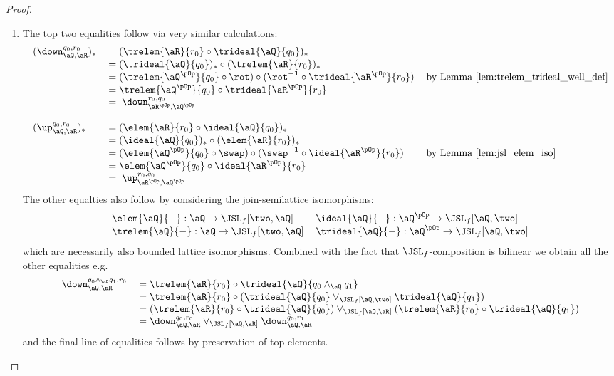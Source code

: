 \documentclass{article}
\begin{document}
\begin{proof}
\item
\begin{enumerate}
\item
The top two equalities follow via very similar calculations:
\[
\begin{tabular}{lll}
$(\down_{\aQ,\aR}^{q_0,r_0})_*$
&
$= (\trelem{\aR}{r_0} \circ \trideal{\aQ}{q_0})_*$
\\&
$= (\trideal{\aQ}{q_0})_* \circ (\trelem{\aR}{r_0})_*$
\\&
$= (\trelem{\aQ^{\pOp}}{q_0} \circ \rot) \circ (\rot^{\bf-1} \circ \trideal{\aR^{\pOp}}{r_0})$
& by Lemma \ref{lem:trelem_trideal_well_def}
\\&
$= \trelem{\aQ^{\pOp}}{q_0} \circ \trideal{\aR^{\pOp}}{r_0}$
\\&
$= \; \down_{\aR^{\pOp},\aQ^{\pOp}}^{r_0,q_0}$
\\
\\
$(\up_{\aQ,\aR}^{q_0,r_0})_*$
&
$= (\elem{\aR}{r_0} \circ \ideal{\aQ}{q_0})_*$
\\&
$= (\ideal{\aQ}{q_0})_* \circ (\elem{\aR}{r_0})_*$
\\&
$= (\elem{\aQ^{\pOp}}{q_0} \circ \swap) \circ (\swap^{\bf-1} \circ \ideal{\aR^{\pOp}}{r_0})$
& by Lemma \ref{lem:jsl_elem_iso}
\\&
$= \elem{\aQ^{\pOp}}{q_0} \circ \ideal{\aR^{\pOp}}{r_0}$
\\&
$= \; \up_{\aR^{\pOp},\aQ^{\pOp}}^{r_0,q_0}$
\end{tabular}
\]
The other equalties also follow by considering the join-semilattice isomorphisms:
\[
\begin{tabular}{ll}
$\elem{\aQ}{-} : \aQ \to \JSL_f[\two,\aQ]$
&
$\ideal{\aQ}{-} : \aQ^{\pOp} \to \JSL_f[\aQ,\two]$
\\
$\trelem{\aQ}{-} : \aQ \to \JSL_f[\two,\aQ]$
&
$\trideal{\aQ}{-} : \aQ^{\pOp} \to \JSL_f[\aQ,\two]$
\end{tabular}
\]
which are necessarily also bounded lattice isomorphisms. Combined with the fact that $\JSL_f$-composition is bilinear we obtain all the other equalities e.g.\
\[
\begin{tabular}{lll}
$\down_{\aQ,\aR}^{q_0 \land_\aQ q_1, r_0}$
&
$= \trelem{\aR}{r_0} \circ \trideal{\aQ}{q_0 \land_\aQ q_1}$
\\&
$= \trelem{\aR}{r_0} \circ (\trideal{\aQ}{q_0} \lor_{\JSL_f[\aQ,\two]} \trideal{\aQ}{q_1})$
\\&
$= (\trelem{\aR}{r_0} \circ \trideal{\aQ}{q_0}) \lor_{\JSL_f[\aQ,\aR]} (\trelem{\aR}{r_0} \circ \trideal{\aQ}{q_1})$
\\&
$= \down_{\aQ,\aR}^{q_0,r_0} \lor_{\JSL_f[\aQ,\aR]} \down_{\aQ,\aR}^{q_0,r_1}$
\end{tabular}
\]
and the final line of equalities follows by preservation of top elements.


\end{enumerate}
\end{proof}
\end{document}
